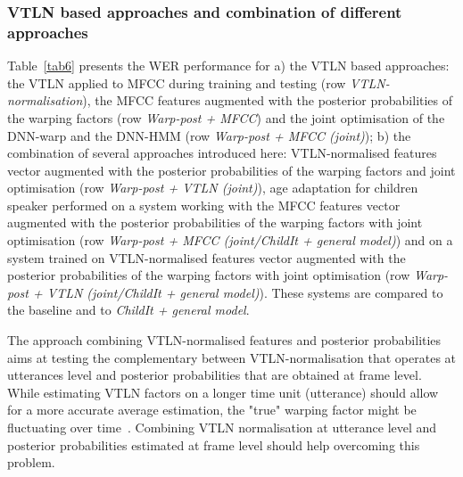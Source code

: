 \documentclass{nle}
\begin{document}
\subsubsection{VTLN based approaches and combination of different approaches}
Table~\ref{tab6} presents the WER performance for a) the VTLN based approaches: the VTLN applied to MFCC during training and testing (row {\em VTLN-normalisation}), the MFCC features augmented with the posterior probabilities of the warping factors (row {\em Warp-post + MFCC}) and the joint optimisation of the DNN-warp and the DNN-HMM (row {\em Warp-post + MFCC (joint)}); b) the combination of several approaches introduced here: VTLN-normalised features vector augmented with the posterior probabilities of the warping factors and joint optimisation (row {\em Warp-post + VTLN (joint)}), age adaptation for children speaker performed on a system working with the MFCC features vector augmented with the posterior probabilities of the warping factors with joint optimisation (row {\em Warp-post + MFCC (joint/ChildIt + general model)}) and on a system trained on VTLN-normalised features vector augmented with the posterior probabilities of the warping factors with joint optimisation (row {\em Warp-post + VTLN (joint/ChildIt + general model)}). These systems are compared to the baseline and to {\em ChildIt + general model}. 

The approach combining VTLN-normalised features and posterior probabilities aims at testing the complementary between VTLN-normalisation that operates at utterances level and posterior probabilities that are obtained at frame level. While estimating VTLN factors on a longer time unit (utterance) should allow for a more accurate average estimation, the "true" warping factor might be fluctuating over time~\citep*{Miguel2005,MaragakisP08}. Combining VTLN normalisation at utterance level and posterior probabilities estimated at frame level should help overcoming this problem.
\end{document}
